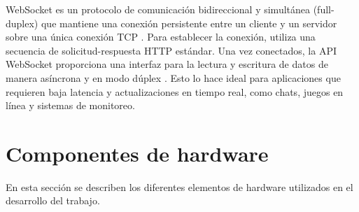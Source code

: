 WebSocket es un protocolo de comunicación bidireccional y simultánea
(full-duplex) que mantiene una conexión persistente entre un cliente y un
servidor sobre una única conexión TCP \cite{RFC6455}. Para establecer la
conexión, utiliza una secuencia de solicitud-respuesta HTTP estándar. Una vez
conectados, la API WebSocket proporciona una interfaz para la lectura y
escritura de datos de manera asíncrona y en modo dúplex \cite{IBMWebSocket}.
Esto lo hace ideal para aplicaciones que requieren baja latencia y
actualizaciones en tiempo real, como chats, juegos en línea y sistemas de
monitoreo.


\section{Componentes de hardware}\label{sec:hardware}

En esta sección se describen los diferentes elementos de hardware utilizados en
el desarrollo del trabajo. %


